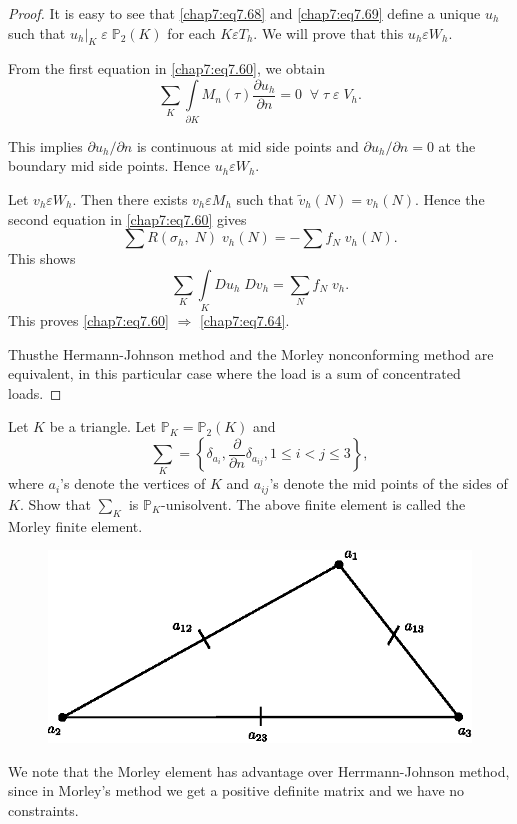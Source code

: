 \begin{proof}
It is easy to see that \eqref{chap7:eq7.68} and \eqref{chap7:eq7.69}
define a unique $u_h$ such that $u_h|_K\;\varepsilon\;\mathbb{P}_2(K)$
for each $K\varepsilon T_h$. We will prove that this $u_h\varepsilon
W_h$. 

From the first equation in \eqref{chap7:eq7.60}, we obtain
$$
\sum\limits_K\int\limits_{\partial K}M_n(\tau)\frac{\partial u_h}
{\partial n}=0\; \; 
\forall \;\tau \;\varepsilon \;V_h.
$$

This implies $\partial u_h/\partial n$ is continuous at mid side
points and $\partial u_h/\partial n=0$ at the boundary mid side
points. Hence $u_h\varepsilon W_h$.

Let $v_h\varepsilon W_h$. Then there exists $v_h\varepsilon M_h$ such
that $\tilde{v}_h(N)=v_h(N)$. Hence the second equation in
\eqref{chap7:eq7.60} gives
$$
\sum R(\sigma_h,\;N)\;v_h(N)=-\sum f_N\;v_h(N).
$$
This shows
$$
\sum\limits_K\int\limits_K Du_h\;Dv_h=\sum\limits_N f_N\;v_h.
$$
This proves \eqref{chap7:eq7.60} $\Rightarrow$ \eqref{chap7:eq7.64}.

Thus\pageoriginale the Hermann-Johnson method and the Morley
nonconforming method are equivalent, in this particular case where the
load is a sum of concentrated loads. 
\end{proof}

\begin{exercise}\label{chap7:exr7}
Let $K$ be a triangle. Let $\mathbb{P}_K=\mathbb{P}_2(K)$ and 
$$
\sum_K=\left\{\delta_{a_i},\frac{\partial}{\partial n}\delta_{a_{ij}},1\leq
i< j\leq 3\right\},
$$
where $a_i$'s denote the vertices of $K$ and $a_{ij}$'s denote the mid
points of the sides of $K$. Show that $\sum_K$ is
$\mathbb{P}_K$-unisolvent. The above finite element is called the
Morley finite element.
\begin{figure}[H]
\centering
\includegraphics{figure/fig7.3.eps}
\caption{}\label{fig7.3}
\end{figure}
\end{exercise}

\begin{REM}\label{chap7:rem11}
We note that the Morley element has advantage over Herrmann-Johnson
method, since in Morley's method we get a positive definite matrix and
we have no constraints. 
\end{REM}






